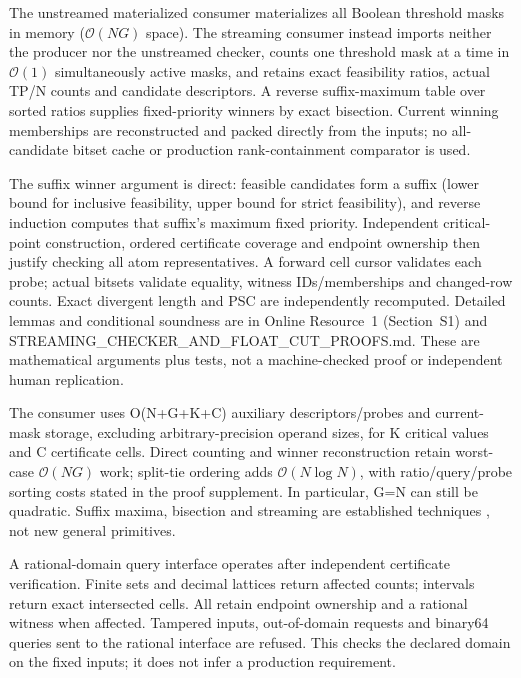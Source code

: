 \documentclass[11pt,a4paper]{article}
\theoremstyle{plain}
\theoremstyle{definition}
\theoremstyle{remark}
\begin{document}
The unstreamed materialized consumer materializes all Boolean threshold masks in memory ($\mathcal{O}(NG)$ space). The streaming consumer instead imports neither the producer nor the unstreamed checker, counts one threshold mask at a time in $\mathcal{O}(1)$ simultaneously active masks, and retains exact feasibility ratios, actual TP/N counts and candidate descriptors. A reverse suffix-maximum table over sorted ratios supplies fixed-priority winners by exact bisection. Current winning memberships are reconstructed and packed directly from the inputs; no all-candidate bitset cache or production rank-containment comparator is used.

The suffix winner argument is direct: feasible candidates form a suffix (lower bound for inclusive feasibility, upper bound for strict feasibility), and reverse induction computes that suffix's maximum fixed priority. Independent critical-point construction, ordered certificate coverage and endpoint ownership then justify checking all atom representatives. A forward cell cursor validates each probe; actual bitsets validate equality, witness IDs/memberships and changed-row counts. Exact divergent length and PSC are independently recomputed. Detailed lemmas and conditional soundness are in Online Resource~1 (Section~S1) and STREAMING\_CHECKER\_AND\_FLOAT\_CUT\_PROOFS.md. These are mathematical arguments plus tests, not a machine-checked proof or independent human replication.

The consumer uses O(N+G+K+C) auxiliary descriptors/probes and current-mask storage, excluding arbitrary-precision operand sizes, for K critical values and C certificate cells. Direct counting and winner reconstruction retain worst-case $\mathcal{O}(NG)$ work; split-tie ordering adds $\mathcal{O}(N \log N)$, with ratio/query/probe sorting costs stated in the proof supplement. In particular, G=N can still be quadratic. Suffix maxima, bisection and streaming are established techniques \cite{mcconnell2011certifying}, not new general primitives.

A rational-domain query interface operates after independent certificate verification. Finite sets and decimal lattices return affected counts; intervals return exact intersected cells. All retain endpoint ownership and a rational witness when affected. Tampered inputs, out-of-domain requests and binary64 queries sent to the rational interface are refused. This checks the declared domain on the fixed inputs; it does not infer a production requirement.
\end{document}
